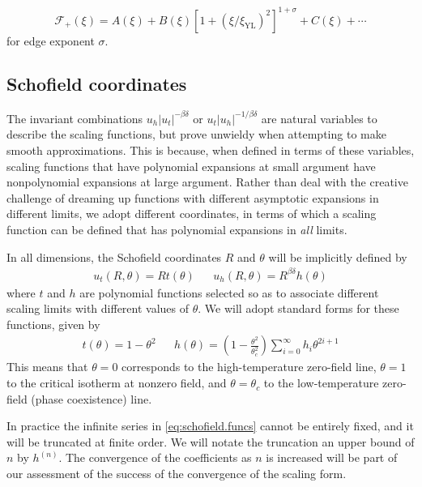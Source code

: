\documentclass[
  aps,
  pre,
  reprint,
  longbibliography,
  floatfix
]{revtex4-2}
\begin{document}
\begin{equation}
  \mathcal F_+(\xi)
  =A(\xi) +B(\xi)[1+(\xi/\xi_{\mathrm{YL}})^2]^{1+\sigma}+C(\xi)+\cdots
\end{equation}
for edge exponent $\sigma$.

\cite{Cardy_1985_Conformal}
\cite{Connelly_2020_Universal}
\cite{An_2016_Functional}
\cite{Zambelli_2017_Lee-Yang}
\cite{Gliozzi_2014_Critical}

\subsection{Schofield coordinates}

The invariant combinations $u_h|u_t|^{-\beta\delta}$ or
$u_t|u_h|^{-1/\beta\delta}$ are natural variables to describe the scaling
functions, but prove unwieldy when attempting to make smooth approximations.
This is because, when defined in terms of these variables, scaling functions
that have polynomial expansions at small argument have nonpolynomial expansions
at large argument. Rather than deal with the creative challenge of dreaming up
functions with different asymptotic expansions in different limits, we adopt
different coordinates, in terms of which a scaling function can be defined that
has polynomial expansions in \emph{all} limits.

In all dimensions, the Schofield coordinates $R$ and $\theta$ will be implicitly defined by
\begin{align} \label{eq:schofield}
  u_t(R, \theta) = Rt(\theta)
  &&
  u_h(R, \theta) = R^{\beta\delta}h(\theta)
\end{align}
where $t$ and $h$ are polynomial functions selected so as to associate different scaling limits with different values of $\theta$. We will adopt standard forms for these functions, given by
\begin{align} \label{eq:schofield.funcs}
  t(\theta)=1-\theta^2
  &&
  h(\theta)=\left(1-\frac{\theta^2}{\theta_c^2}\right)\sum_{i=0}^\infty h_i\theta^{2i+1}
\end{align}
This means that $\theta=0$ corresponds to the high-temperature zero-field line,
$\theta=1$ to the critical isotherm at nonzero field, and $\theta=\theta_c$ to
the low-temperature zero-field (phase coexistence) line.

In practice the infinite series in \eqref{eq:schofield.funcs} cannot be
entirely fixed, and it will be truncated at finite order. We will notate the
truncation an upper bound of $n$ by $h^{(n)}$. The convergence of the
coefficients as $n$ is increased will be part of our assessment of the success
of the convergence of the scaling form.
\end{document}
